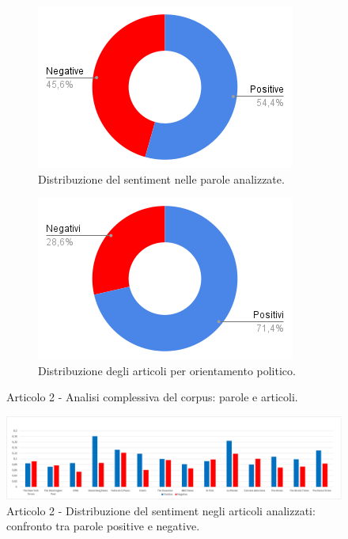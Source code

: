 \begin{figure}[H]
    \centering
    \begin{subfigure}[t]{0.48\textwidth}
        \centering
        \includegraphics[width=\linewidth]{Immagini//Articolo2/Articolo 2 - Rapporto Totale Parole.png}
        \caption{Distribuzione del sentiment nelle parole analizzate.}
        \label{fig:totale-parole-a2}
    \end{subfigure}
    \hfill
    \begin{subfigure}[t]{0.48\textwidth}
        \centering
        \includegraphics[width=\linewidth]{Immagini//Articolo2/Articolo 2 - Rapporto Totale Articoli.png}
        \caption{Distribuzione degli articoli per orientamento politico.}
        \label{fig:totale-articoli-a2}
    \end{subfigure}
    \caption{Articolo 2 - Analisi complessiva del corpus: parole e articoli.}
    \label{fig:analisi-totale-a2}

    \centering
    \includegraphics[width=1\linewidth]{Immagini//Articolo2/Articolo 2 - Analisi Grafica Risultati Totali.png}
    \caption{Articolo 2 - Distribuzione del sentiment negli articoli analizzati: confronto tra parole positive e negative.}
    \label{fig:risultati-totali-a2}
\end{figure}

